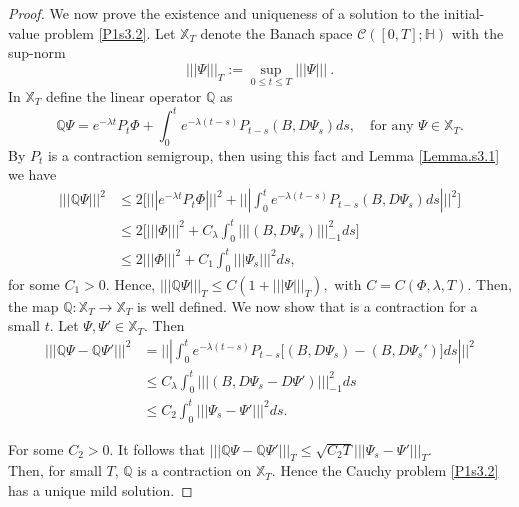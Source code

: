 \documentclass[review,onefignum,onetabnum]{siamart190516}
\begin{document}
\begin{proof}
We now prove the existence and uniqueness of a solution to the initial- value
problem \eqref{P1s3.2}. Let $\mathbb{X}_T$ denote the
Banach space $\mathcal{C}([0,T];\mathbb{H})$ with the sup-norm
 \begin{equation*}
  |||\Psi |||_T := \sup_{0\le t\le T} |||\Psi ||| \ .
 \end{equation*}
In $\mathbb{X}_T$ define the linear operator $\mathbb{Q}$ as
\begin{equation*}
 \mathbb{Q}\Psi= e^{-\lambda t}P_t\Phi + \int_0^t e^{-\lambda
(t-s)}P_{t-s}(B,D\Psi_s) ds,\quad\mbox{for any } \Psi\in\mathbb{X}_T.
\end{equation*}
By  $P_t$ is a contraction semigroup, then using this
fact and Lemma \ref{Lemma.s3.1} we have
\begin{align*}
 ||| \mathbb{Q}\Psi|||^2 &\le 2\Bigg[ ||| e^{-\lambda t}P_t\Phi|||^2 +
|||\int_0^t e^{-\lambda (t-s)}P_{t-s}(B,D\Psi_s) ds |||^2\Bigg]\\
 &\le 2\Big[ |||\Phi|||^2 + C_\lambda \int_0^t |||(B,D\Psi_s) |||_{-1}^2 ds
\Big] \\
 &\le 2 |||\Phi|||^2 + C_1 \int_0^t |||\Psi_s|||^2 ds,
\end{align*}
for some $C_1>0$. Hence,
$
 ||| \mathbb{Q}\Psi|||_T \le C(1+||| \Psi|||_T),
$
with $C=C(\Phi,\lambda, T)$. Then, the map $\mathbb{Q}:\mathbb{X}_T
\rightarrow \mathbb{X}_T$ is well defined. We now show that is a contraction
for a
small $t$. Let $\Psi,\Psi'\in \mathbb{X}_T$. Then
\begin{align*}
 ||| \mathbb{Q}\Psi- \mathbb{Q}\Psi'|||^2 &=  |||\int_0^t e^{-\lambda
(t-s)}P_{t-s}\big[(B,D\Psi_s)-(B,D\Psi_s')\big] ds |||^2\\
 &\le  C_\lambda \int_0^t |||(B,D\Psi_s-D\Psi') |||_{-1}^2 ds \\
 &\le  C_2 \int_0^t |||\Psi_s-\Psi'|||^2 ds.
\end{align*}

For some $C_2>0$. It follows that
$
 ||| \mathbb{Q}\Psi- \mathbb{Q}\Psi'|||_T  \le  \sqrt{C_2 T}
|||\Psi_s-\Psi'|||_T.
$
\\
Then, for small $T$, $\mathbb{Q}$ is a contraction on $\mathbb{X}_T$. Hence
the Cauchy problem \eqref{P1s3.2} has a unique mild solution.
\newline
\end{proof}
\end{document}
